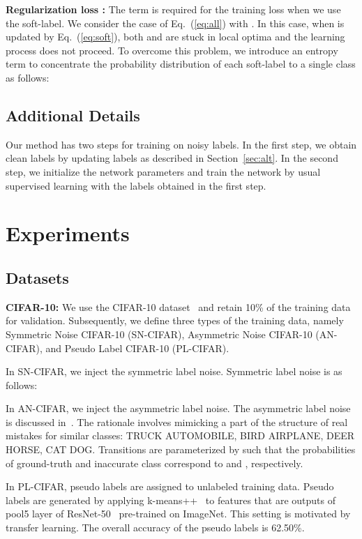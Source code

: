 \documentclass[10pt,twocolumn,letterpaper]{article}
\newcommand{\Eref}[1]{Eq.~(\ref{#1})}
\newcommand{\Sref}[1]{Section~\ref{#1}}
\begin{document}
\vspace{2mm}\noindent\textbf{Regularization loss :}
The term  is required for the training loss when we use the soft-label. We consider the case of \Eref{eq:all} with . In this case, when  is updated by \Eref{eq:soft}, both  and  are stuck in local optima and the learning process does not proceed. To overcome this problem, we introduce an entropy term to concentrate the probability distribution of each soft-label to a single class as follows:


\subsection{Additional Details}
Our method has two steps for training on noisy labels. In the first step, we obtain clean labels by updating labels as described in \Sref{sec:alt}. In the second step, we initialize the network parameters and train the network by usual supervised learning with the labels obtained in the first step.

\section{Experiments}
\subsection{Datasets}
\noindent\textbf{CIFAR-10:}
We use the CIFAR-10 dataset~\cite{krizhevsky2009learning} and retain 10\% of the training data for validation. Subsequently, we define three types of the training data, namely Symmetric Noise CIFAR-10 (SN-CIFAR), Asymmetric Noise CIFAR-10 (AN-CIFAR), and Pseudo Label CIFAR-10 (PL-CIFAR).

In SN-CIFAR, we inject the symmetric label noise. Symmetric label noise is as follows:


In AN-CIFAR, we inject the asymmetric label noise. The asymmetric label noise is discussed in~\cite{patrini2016making}. The rationale involves mimicking a part of the structure of real mistakes for similar classes: TRUCK  AUTOMOBILE, BIRD  AIRPLANE, DEER  HORSE, CAT  DOG. Transitions are parameterized by  such that the probabilities of ground-truth and inaccurate class correspond to  and , respectively.

In PL-CIFAR, pseudo labels are assigned to unlabeled training data. Pseudo labels are generated by applying k-means++~\cite{arthur2007k} to features that are outputs of pool5 layer of ResNet-50~\cite{he2016deep} pre-trained on ImageNet. This setting is motivated by transfer learning. The overall accuracy of the pseudo labels is 62.50\%.
\end{document}
